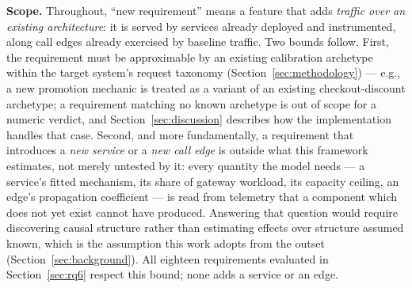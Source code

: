 \documentclass[journal, 10pt]{IEEEtran}
\begin{document}
\textbf{Scope.} Throughout, ``new requirement'' means a feature that adds
\emph{traffic over an existing architecture}: it is served by services already
deployed and instrumented, along call edges already exercised by baseline
traffic. Two bounds follow. First, the requirement must be approximable by an
existing calibration archetype within the target system's request taxonomy
(Section~\ref{sec:methodology}) --- e.g., a new promotion mechanic is treated as
a variant of an existing checkout-discount archetype; a requirement matching no
known archetype is out of scope for a numeric verdict, and
Section~\ref{sec:discussion} describes how the implementation handles that case.
Second, and more fundamentally, a requirement that introduces a \emph{new
service} or a \emph{new call edge} is outside what this framework estimates, not
merely untested by it: every quantity the model needs --- a service's fitted
mechanism, its share of gateway workload, its capacity ceiling, an edge's
propagation coefficient --- is read from telemetry that a component which does
not yet exist cannot have produced. Answering that question would require
discovering causal structure rather than estimating effects over structure
assumed known, which is the assumption this work adopts from the outset
(Section~\ref{sec:background}). All eighteen requirements evaluated in
Section~\ref{sec:rq6} respect this bound; none adds a service or an edge.
\end{document}
